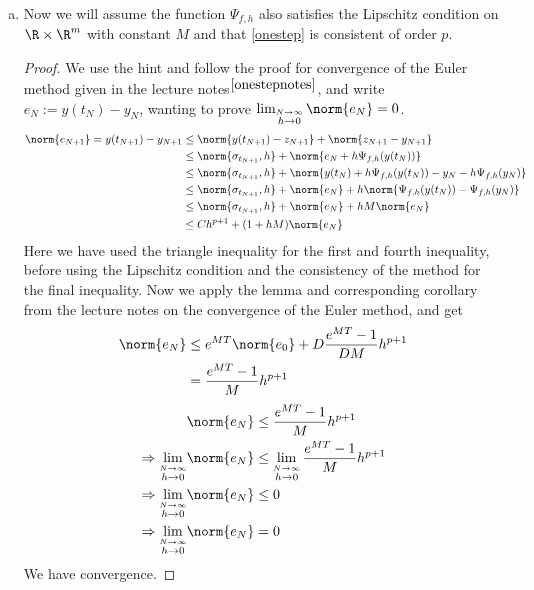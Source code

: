 \begin{enumerate}[a)]
  \item
Now we will assume the function $\Psi_{f, h}$ also satisfies the Lipschitz condition on $\R\times\R^m$ with constant $M$ and that \ref{onestep} is consistent of order $p$.
\begin{proof}
  We use the hint and follow the proof for convergence of the Euler method given in the lecture notes$^{\ref{onestepnotes}}$, and write $e_N:=y(t_N)-y_N$, wanting to prove $\lim_{\stackrel{N\to \infty}{h\to 0}}\norm{e_N}=0$.
    \begin{align*}
      \norm{e_{N+1}}  = y(t_{N+1})-y_{N+1} & \leq \norm{y(t_{N+1})-z_{N+1}}+\norm{z_{N+1}-y_{N+1}} \\
        & \leq \norm{\sigma_{t_{N+1}}, h} + \norm{e_N+h\Psi_{f,h}(y(t_N))} \\
        & \leq \norm{\sigma_{t_{N+1}}, h} + \norm{y(t_N)+ h\Psi_{f,h}(y(t_N))-y_N-h\Psi_{f,h}(y_N)} \\
        & \leq \norm{\sigma_{t_{N+1}}, h} + \norm{e_N}+ h\norm{\Psi_{f,h}(y(t_N))-\Psi_{f,h}(y_N)} \\
        & \leq \norm{\sigma_{t_{N+1}}, h} + \norm{e_N}+hM\norm{e_N} \\
        & \leq Ch^{p+1} + (1+hM)\norm{e_N}
    \end{align*}
Here we have used the triangle inequality for the first and fourth inequality, before using the Lipschitz condition and the consistency of the method for the final inequality. Now we apply the lemma and corresponding corollary from the lecture notes on the convergence of the Euler method, and get
  \begin{align*}
    \norm{e_N} & \leq e^{MT} \norm{e_0}+D\frac{e^{MT}-1}{DM}h^{p+1} \\
      & = \frac{e^{MT}-1}{M}h^{p+1}
  \end{align*}
  \begin{align*}
     & \norm{e_N} \leq \frac{e^{MT}-1}{M}h^{p+1} \\
    \Rightarrow \lim_{\stackrel{N\to\infty}{h\to 0}} & \norm{e_N} \leq \lim_{\stackrel{N\to\infty}{h\to 0}} \frac{e^{MT}-1}{M}h^{p+1} \\
    \Rightarrow \lim_{\stackrel{N\to\infty}{h\to 0}} & \norm{e_N} \leq 0 \\
    \Rightarrow \lim_{\stackrel{N\to\infty}{h\to 0}} & \norm{e_N} =  0
  \end{align*}
We have convergence.
\end{proof}


\end{enumerate}
